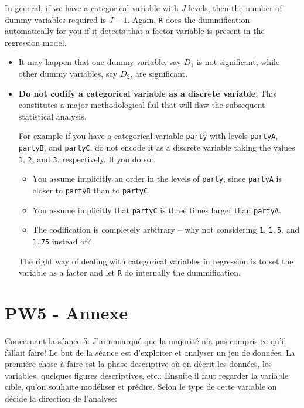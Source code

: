 \documentclass[]{book}
\providecommand{\tightlist}{%
  \setlength{\itemsep}{0pt}\setlength{\parskip}{0pt}}
\newenvironment{rmdblock}[1]
  {\begin{shaded*}
  \begin{itemize}
  \renewcommand{\labelitemi}{
    \raisebox{-.7\height}[0pt][0pt]{
      {\setkeys{Gin}{width=2em,keepaspectratio}\texttt{[image: img/icons/\#1]}}
    }
  }
  \item
  }
  {
  \end{itemize}
  \end{shaded*}
  }
\newenvironment{rmdcaution}
  {\begin{rmdblock}{caution}}
  {\end{rmdblock}}
\newenvironment{rmdinsight}
  {\begin{rmdblock}{insight}}
  {\end{rmdblock}}
\theoremstyle{definition}
\theoremstyle{definition}
\theoremstyle{definition}
\theoremstyle{remark}
\begin{document}
In general, if we have a categorical variable with \(J\) levels, then
the number of dummy variables required is \(J-1\). Again, \texttt{R}
does the dummification automatically for you if it detects that a factor
variable is present in the regression model.

\begin{rmdinsight}
It may happen that one dummy variable, say \(D_1\) is not significant,
while other dummy variables, say \(D_2\), are significant.
\end{rmdinsight}

\begin{rmdcaution}
\textbf{Do not codify a categorical variable as a discrete variable}.
This constitutes a major methodological fail that will flaw the
subsequent statistical analysis.

For example if you have a categorical variable \texttt{party} with
levels \texttt{partyA}, \texttt{partyB}, and \texttt{partyC}, do not
encode it as a discrete variable taking the values \texttt{1},
\texttt{2}, and \texttt{3}, respectively. If you do so:

\begin{itemize}
\tightlist
\item
  You assume implicitly an order in the levels of \texttt{party}, since
  \texttt{partyA} is closer to \texttt{partyB} than to \texttt{partyC}.
\item
  You assume implicitly that \texttt{partyC} is three times larger than
  \texttt{partyA}.
\item
  The codification is completely arbitrary -- why not considering
  \texttt{1}, \texttt{1.5}, and \texttt{1.75} instead of?
\end{itemize}

The right way of dealing with categorical variables in regression is to
set the variable as a factor and let \texttt{R} do internally the
dummification.
\end{rmdcaution}

\chapter{PW5 - Annexe}\label{pw5---annexe}

Concernant la séance 5: J'ai remarqué que la majorité n'a pas compris ce
qu'il fallait faire! Le but de la séance est d'exploiter et analyser un
jeu de données. La première chose à faire est la phase descriptive où on
décrit les données, les variables, quelques figures descriptives, etc..
Ensuite il faut regarder la variable cible, qu'on souhaite modéliser et
prédire. Selon le type de cette variable on décide la direction de
l'analyse:
\end{document}
